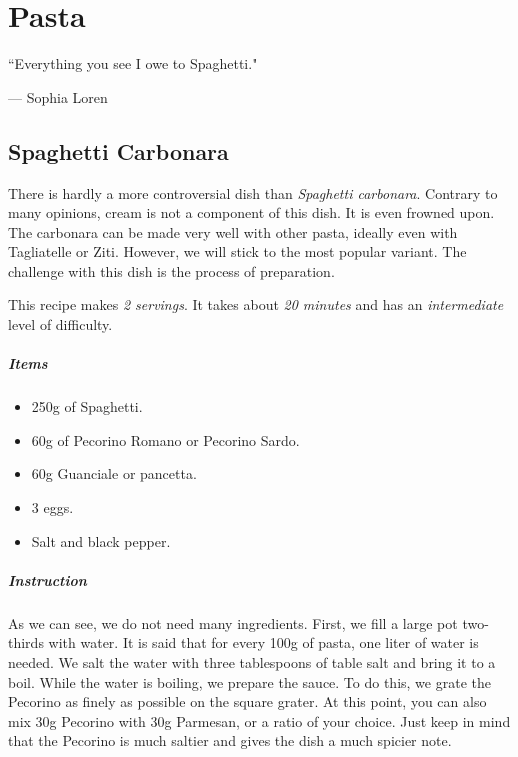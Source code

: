 \chapter{Pasta}
\label{pasta}
\epigraph{``Everything you see I owe to Spaghetti."}{--- \textup{Sophia Loren}}

\section{Spaghetti Carbonara}
\label{Spaghetticarbonara}
There is hardly a more controversial dish than \emph{Spaghetti carbonara}. Contrary to many opinions, cream is not a component of this dish. It is even frowned upon. The carbonara can be made very well with other pasta, ideally even with Tagliatelle or Ziti. However, we will stick to the most popular variant. The challenge with this dish is the process of preparation.

This recipe makes \emph{2 servings}. It takes about \emph{20 minutes} and has an \emph{intermediate} level of difficulty. 

\paragraph{Items}
\begin{itemize}[noitemsep]
    \item[\ding{182}] 250g of Spaghetti.
    \item[\ding{183}] 60g of Pecorino Romano or Pecorino Sardo.
    \item[\ding{184}] 60g Guanciale or pancetta.
    \item[\ding{185}] 3 eggs.
    \item[\ding{186}] Salt and black pepper.
\end{itemize}

\paragraph{Instruction} 
As we can see, we do not need many ingredients. First, we fill a large pot two-thirds with water. It is said that for every 100g of pasta, one liter of water is needed. We salt the water with three tablespoons of table salt and bring it to a boil. While the water is boiling, we prepare the sauce. To do this, we grate the Pecorino as finely as possible on the square grater. At this point, you can also mix 30g Pecorino with 30g Parmesan, or a ratio of your choice. Just keep in mind that the Pecorino is much saltier and gives the dish a much spicier note.


